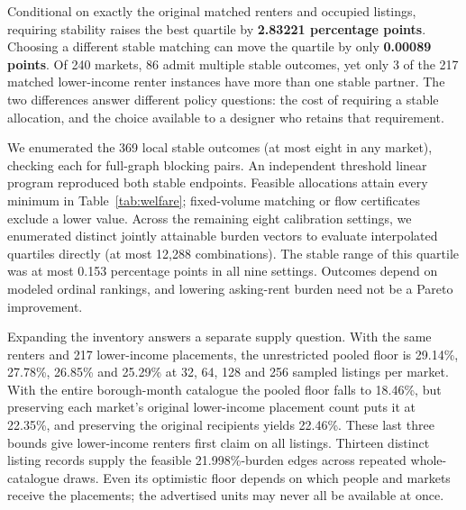 Conditional on exactly the original matched renters and occupied listings, requiring stability raises the best quartile by \textbf{2.83221 percentage points}. Choosing a different stable matching can move the quartile by only \textbf{0.00089 points}. Of 240 markets, 86 admit multiple stable outcomes, yet only 3 of the 217 matched lower-income renter instances have more than one stable partner. The two differences answer different policy questions: the cost of requiring a stable allocation, and the choice available to a designer who retains that requirement.

We enumerated the 369 local stable outcomes (at most eight in any market), checking each for full-graph blocking pairs. An independent threshold linear program reproduced both stable endpoints. Feasible allocations attain every minimum in Table~\ref{tab:welfare}; fixed-volume matching or flow certificates exclude a lower value. Across the remaining eight calibration settings, we enumerated distinct jointly attainable burden vectors to evaluate interpolated quartiles directly (at most 12,288 combinations). The stable range of this quartile was at most 0.153 percentage points in all nine settings. Outcomes depend on modeled ordinal rankings, and lowering asking-rent burden need not be a Pareto improvement.

Expanding the inventory answers a separate supply question. With the same renters and 217 lower-income placements, the unrestricted pooled floor is 29.14\%, 27.78\%, 26.85\% and 25.29\% at 32, 64, 128 and 256 sampled listings per market. With the entire borough-month catalogue the pooled floor falls to 18.46\%, but preserving each market's original lower-income placement count puts it at 22.35\%, and preserving the original recipients yields 22.46\%. These last three bounds give lower-income renters first claim on all listings. Thirteen distinct listing records supply the feasible 21.998\%-burden edges across repeated whole-catalogue draws. Even its optimistic floor depends on which people and markets receive the placements; the advertised units may never all be available at once.
